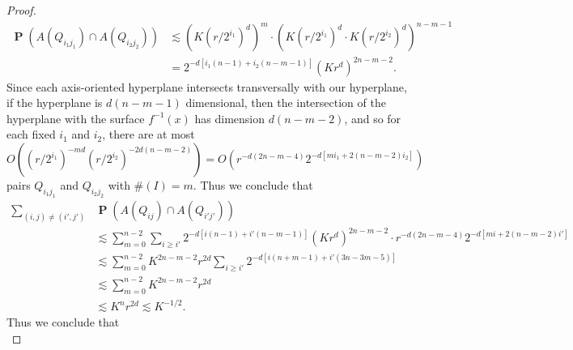 \documentclass[12pt,reqno]{article}
\numberwithin{equation}{section}
\numberwithin{theorem}{section}
\DeclareMathOperator{\PP}{\mathbf{P}}
\begin{document}
\begin{proof}
    \begin{equation}
    \begin{split}
        \PP(A(Q_{i_1j_1}) \cap A(Q_{i_2j_2})) &\lesssim (K(r/2^{i_1})^d)^m \cdot (K(r/2^{i_1})^d \cdot K(r/2^{i_2})^d)^{n-m-1}\\
        &= 2^{-d[i_1(n-1) + i_2(n-m-1)]} (Kr^d)^{2n - m-2}.
    \end{split}
    \end{equation}
    Since each axis-oriented hyperplane intersects transversally with our hyperplane, if the hyperplane is $d(n-m-1)$ dimensional, then the intersection of the hyperplane with the surface $f^{-1}(x)$ has dimension $d(n-m-2)$, and so for each fixed $i_1$ and $i_2$, there are at most
    \begin{equation}
        O((r/2^{i_1})^{-md} (r/2^{i_2})^{-2d(n-m-2)}) = O(r^{-d(2n - m - 4)} 2^{-d[mi_1 + 2(n-m-2)i_2]} )
    \end{equation}
    pairs $Q_{i_1j_1}$ and $Q_{i_2j_2}$ with $\#(I) = m$. Thus we conclude that
    \begin{equation}
    \begin{split}
        \sum_{(i,j) \neq (i',j')}& \PP(A(Q_{ij}) \cap A(Q_{i'j'}))\\
        &\lesssim \sum_{m = 0}^{n-2} \sum_{i \geq i'} 2^{-d[i(n-1) + i'(n-m-1)]} (Kr^d)^{2n - m - 2} \cdot r^{-d(2n - m - 4)} 2^{-d[mi + 2(n-m-2)i']}\\
        &\lesssim \sum_{m = 0}^{n-2} K^{2n-m-2} r^{2d} \sum_{i \geq i'} 2^{-d[i(n+m-1) + i'(3n-3m-5)]}\\
        &\lesssim \sum_{m = 0}^{n-2} K^{2n-m-2} r^{2d}\\
        &\lesssim K^n r^{2d} \lesssim K^{-1/2}.
    \end{split}
    \end{equation}
    Thus we conclude that
    \begin{equation}

\end{equation}
\end{proof}
\end{document}
